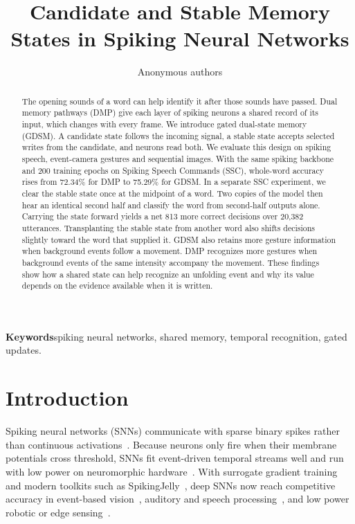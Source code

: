 \documentclass[10pt,twocolumn]{article}
\title{\vspace{-1.1cm}\textbf{Candidate and Stable Memory States in Spiking Neural Networks}}
\author{Anonymous authors}
\date{}
\begin{document}
\maketitle
\begin{abstract}
The opening sounds of a word can help identify it after those sounds have passed. Dual memory pathways (DMP) give each layer of spiking neurons a shared record of its input, which changes with every frame. We introduce gated dual-state memory (GDSM). A candidate state follows the incoming signal, a stable state accepts selected writes from the candidate, and neurons read both. We evaluate this design on spiking speech, event-camera gestures and sequential images. With the same spiking backbone and 200 training epochs on Spiking Speech Commands (SSC), whole-word accuracy rises from 72.34\% for DMP to 75.29\% for GDSM. In a separate SSC experiment, we clear the stable state once at the midpoint of a word. Two copies of the model then hear an identical second half and classify the word from second-half outputs alone. Carrying the state forward yields a net 813 more correct decisions over 20,382 utterances. Transplanting the stable state from another word also shifts decisions slightly toward the word that supplied it. GDSM also retains more gesture information when background events follow a movement. DMP recognizes more gestures when background events of the same intensity accompany the movement. These findings show how a shared state can help recognize an unfolding event and why its value depends on the evidence available when it is written.
\end{abstract}
\noindent\textbf{Keywords}\quad spiking neural networks, shared memory, temporal recognition, gated updates.

\section{Introduction}
Spiking neural networks (SNNs) communicate with sparse binary spikes rather than continuous activations~\cite{maass1997}. Because neurons only fire when their membrane potentials cross threshold, SNNs fit event-driven temporal streams well and run with low power on neuromorphic hardware~\cite{roy2019}. With surrogate gradient training~\cite{surrogate,eshraghian2023} and modern toolkits such as SpikingJelly~\cite{spikingjelly}, deep SNNs now reach competitive accuracy in event-based vision~\cite{gallego2022,gesture}, auditory and speech processing~\cite{shd,yin2021}, and low power robotic or edge sensing~\cite{davies2021,bartolozzi2022}.
\end{document}
